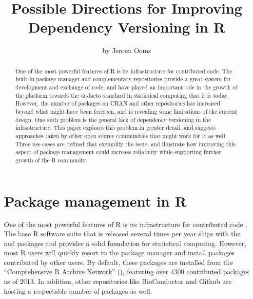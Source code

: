 \title{Possible Directions for Improving Dependency Versioning in R}
\author{by Jeroen Ooms}

\maketitle

\begin{abstract}
One of the most powerful features of R is its infrastructure for contributed
code. The built-in package manager and complementary repositories
provide a great system for development and exchange of code, and have played an
important role in the growth of the platform towards the de-facto standard in
statistical computing that it is today. However, the number of packages on CRAN
and other repositories has increased beyond what might have been foreseen, and
is revealing some limitations of the current design. One such problem is the
general lack of dependency versioning in the infrastructure. This paper explores
this problem in greater detail, and suggests approaches taken by other open
source communities that might work for R as well. Three use cases are defined that
exemplify the issue, and illustrate how improving this aspect of package management
could increase reliability while supporting further growth of the R community.
\end{abstract}

\section{Package management in R}

One of the most powerful features of R is its infrastructure for contributed
code \citep{fox2009aspects}. The base R software suite that is released several
times per year ships with the  and  packages and
provides a solid foundation for statistical computing. However, most R users
will quickly resort to the package manager and install packages contributed by
other users. By default, these packages are installed from the ``Comprehensive
R Archive Network'' (), featuring over 4300 contributed packages as
of 2013. In addition, other repositories like BioConductor \citep{bioc} and
Github \citep{dabbish2012social} are hosting a respectable number of packages
as well.

